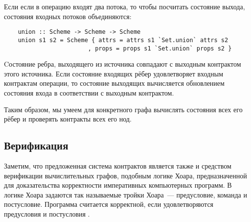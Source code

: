 Если если в операцию входят два потока, то чтобы посчитать состояние выхода, состояния входных потоков объединяются:

\begin{lstlisting}
    union :: Scheme -> Scheme -> Scheme
    union s1 s2 = Scheme { attrs = attrs s1 `Set.union` attrs s2
                        , props = props s1 `Set.union` props s2 }
\end{lstlisting}

Cостояние ребра, выходящего из источника совпадают с выходным контрактом этого источника. Если состояние входящих рёбер удовлетворяет входным контрактам операции, то состояние выходящих вычисляется обновлением состояния входа в соответствии с выходным контрактом.

Таким образом, мы умеем для конкретного графа вычислять состояния всех его рёбер и проверять контракты всех его нод.


\subsection{Верификация}

Заметим, что предложенная система контрактов является также и средством верификации вычислительных графов, подобным логике Хоара, предназначенной для доказательства корректности императивных компьютерных программ. В логике Хоара задаются так называемые тройки Хоара~--- предусловие, команда и постусловие. Программа считается корректной, если удовлетворяются предусловия и постусловия \cite{hoare}.
